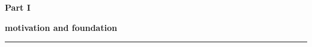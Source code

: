 \begin{titlepage}
	\vspace*{100pt}
	
	{\Huge \textbf{Part I}}
	
	\vspace{20pt}
	
	{\Huge \textbf{motivation and foundation}}
	
	\vspace{20pt}
	
	\noindent\rule[0.5ex]{\linewidth}{1.5pt} %
\end{titlepage}

